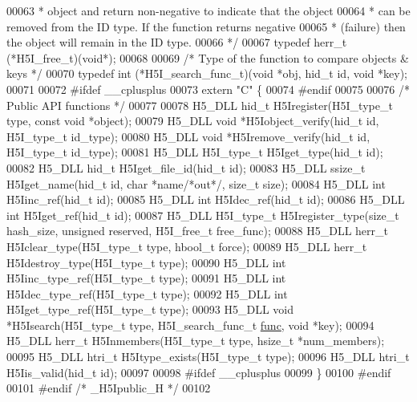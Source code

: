\begin{DoxyCode}
00063 \textcolor{comment}{ * object and return non-negative to indicate that the object}
00064 \textcolor{comment}{ * can be removed from the ID type. If the function returns negative}
00065 \textcolor{comment}{ * (failure) then the object will remain in the ID type.}
00066 \textcolor{comment}{ */}
00067 \textcolor{keyword}{typedef} herr\_t (*H5I\_free\_t)(\textcolor{keywordtype}{void}*);
00068 
00069 \textcolor{comment}{/* Type of the function to compare objects & keys */}
00070 \textcolor{keyword}{typedef} int (*H5I\_search\_func\_t)(\textcolor{keywordtype}{void} *obj, hid\_t id, \textcolor{keywordtype}{void} *key);
00071 
00072 \textcolor{preprocessor}{#ifdef \_\_cplusplus}
00073 \textcolor{keyword}{extern} \textcolor{stringliteral}{"C"} \{
00074 \textcolor{preprocessor}{#endif}
00075 
00076 \textcolor{comment}{/* Public API functions */}
00077 
00078 H5\_DLL hid\_t H5Iregister(H5I\_type\_t type, \textcolor{keyword}{const} \textcolor{keywordtype}{void} *\textcolor{keywordtype}{object});
00079 H5\_DLL \textcolor{keywordtype}{void} *H5Iobject\_verify(hid\_t \textcolor{keywordtype}{id}, H5I\_type\_t id\_type);
00080 H5\_DLL \textcolor{keywordtype}{void} *H5Iremove\_verify(hid\_t \textcolor{keywordtype}{id}, H5I\_type\_t id\_type);
00081 H5\_DLL H5I\_type\_t H5Iget\_type(hid\_t \textcolor{keywordtype}{id});
00082 H5\_DLL hid\_t H5Iget\_file\_id(hid\_t \textcolor{keywordtype}{id});
00083 H5\_DLL ssize\_t H5Iget\_name(hid\_t \textcolor{keywordtype}{id}, \textcolor{keywordtype}{char} *name\textcolor{comment}{/*out*/}, \textcolor{keywordtype}{size\_t} size);
00084 H5\_DLL \textcolor{keywordtype}{int} H5Iinc\_ref(hid\_t \textcolor{keywordtype}{id});
00085 H5\_DLL \textcolor{keywordtype}{int} H5Idec\_ref(hid\_t \textcolor{keywordtype}{id});
00086 H5\_DLL \textcolor{keywordtype}{int} H5Iget\_ref(hid\_t \textcolor{keywordtype}{id});
00087 H5\_DLL H5I\_type\_t H5Iregister\_type(\textcolor{keywordtype}{size\_t} hash\_size, \textcolor{keywordtype}{unsigned} reserved, H5I\_free\_t free\_func);
00088 H5\_DLL herr\_t H5Iclear\_type(H5I\_type\_t type, hbool\_t force);
00089 H5\_DLL herr\_t H5Idestroy\_type(H5I\_type\_t type);
00090 H5\_DLL \textcolor{keywordtype}{int} H5Iinc\_type\_ref(H5I\_type\_t type);
00091 H5\_DLL \textcolor{keywordtype}{int} H5Idec\_type\_ref(H5I\_type\_t type);
00092 H5\_DLL \textcolor{keywordtype}{int} H5Iget\_type\_ref(H5I\_type\_t type);
00093 H5\_DLL \textcolor{keywordtype}{void} *H5Isearch(H5I\_type\_t type, H5I\_search\_func\_t \hyperlink{structfunc}{func}, \textcolor{keywordtype}{void} *key);
00094 H5\_DLL herr\_t H5Inmembers(H5I\_type\_t type, hsize\_t *num\_members);
00095 H5\_DLL htri\_t H5Itype\_exists(H5I\_type\_t type);
00096 H5\_DLL htri\_t H5Iis\_valid(hid\_t \textcolor{keywordtype}{id});
00097 
00098 \textcolor{preprocessor}{#ifdef \_\_cplusplus}
00099 \}
00100 \textcolor{preprocessor}{#endif}
00101 \textcolor{preprocessor}{#endif }\textcolor{comment}{/* \_H5Ipublic\_H */}\textcolor{preprocessor}{}
00102 
\end{DoxyCode}
